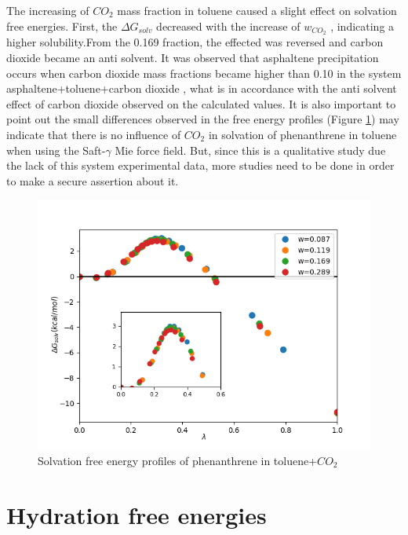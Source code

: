 The increasing of $CO_{2}$ mass fraction in toluene caused a slight effect on solvation free energies. First, the $\Delta G_{solv}$ decreased with the increase of $w_{CO_{2}}$ , indicating a higher solubility.From the 0.169 fraction, the effected was reversed and carbon dioxide became an anti solvent. It was observed that asphaltene precipitation occurs when carbon dioxide mass fractions became higher than 0.10 in the system asphaltene+toluene+carbon dioxide \cite{SOROUSH2014405}, what is in accordance with the anti solvent effect of carbon dioxide observed on the calculated values. It is also important to point out the small differences observed in the free energy profiles (Figure \ref{fig:Figure_1}) may indicate that there is no influence of $CO_{2}$ in solvation of phenanthrene in toluene when using the Saft-$\gamma$ Mie force field. But, since this is a qualitative study due the lack of this system experimental data, more studies need to be done in order to make a secure assertion about it.   

\begin{figure}[H]
\centering
\includegraphics[width=0.9\linewidth]{Figures/Figure_1}
\caption{Solvation free energy profiles of phenanthrene in toluene+$CO_{2}$}
\label{fig:Figure_1}
\end{figure}


\section{Hydration free energies}


